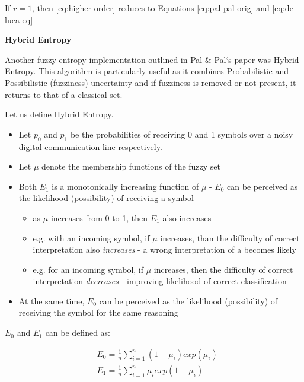 If $r = 1$, then \eqref{eq:higher-order} reduces to Equations \eqref{eq:pal-pal-orig} and \eqref{eq:de-luca-eq}

\noindent \textbf{Hybrid Entropy}

Another fuzzy entropy implementation outlined in Pal \& Pal`s paper was Hybrid Entropy. This algorithm is particularly useful as it combines Probabilistic and Possibilistic (fuzziness) uncertainty and if fuzziness is removed or not present, it returns to that of a classical set.

Let us define Hybrid Entropy.

\begin{itemize}
\item Let $p_0$ and $p_1$ be the probabilities of receiving 0 and 1 symbols over a noisy digital communication line respectively.
\item Let $\mu$ denote the membership functions of the fuzzy set 
\item Both $E_1$ is a monotonically increasing function of $\mu$ - $E_0$ can be perceived as the likelihood (possibility) of receiving a  symbol
\begin{itemize}
    \item as $\mu$ increases from 0 to 1, then $E_1$ also increases
    \item e.g. with an incoming  symbol, if $\mu$ increases, than the difficulty of correct interpretation also \textit{increases} - a wrong interpretation of a  becomes likely
    \item e.g. for an incoming  symbol, if $\mu$ increases, then the difficulty of correct interpretation \textit{decreases} - improving likelihood of correct classification
  \end{itemize}
\item At the same time, $E_0$ can be perceived as the likelihood (possibility) of receiving the  symbol for the same reasoning
\end{itemize}

$E_0$ and $E_1$ can be defined as:

\begin{subequations} \label{eq:E0-E1}
  \begin{align}
    &E_0 = \frac{1}{n}\displaystyle\sum_{i=1}^{n}{(1-\mu_i)exp(\mu_i)} \\
    &E_1 = \frac{1}{n}\displaystyle\sum_{i=1}^{n}{\mu_iexp(1-\mu_i)}
  \end{align}
\end{subequations}

